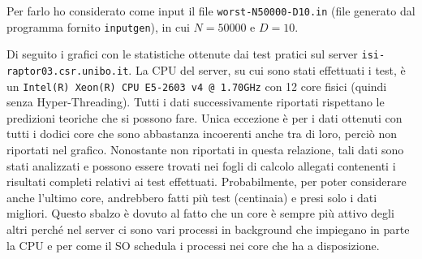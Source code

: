 \documentclass[11pt, a4paper]{article}
\begin{document}
Per farlo ho considerato come input il file \texttt{worst-N50000-D10.in} (file generato dal programma fornito \texttt{inputgen}),
in cui \(N = 50000\) e \(D = 10\).

Di seguito i grafici con le statistiche ottenute dai test pratici sul server
\texttt{isi-raptor03.\allowbreak csr.\allowbreak unibo.\allowbreak it}.
La CPU del server, su cui sono stati effettuati i test, è un \texttt{Intel(R) Xeon(R) CPU E5-2603 v4 @ 1.70GHz} con 12 core
fisici (quindi senza Hyper-Threading).
Tutti i dati successivamente riportati rispettano le predizioni teoriche che si possono fare.
Unica eccezione è per i dati ottenuti con tutti i dodici core che sono abbastanza incoerenti anche tra di loro, perciò non
riportati nel grafico.
Nonostante non riportati in questa relazione, tali dati sono stati analizzati e possono essere trovati nei fogli di calcolo
allegati contenenti i risultati completi relativi ai test effettuati.
Probabilmente, per poter considerare anche l'ultimo core, andrebbero fatti più test (centinaia) e presi solo i dati migliori.
Questo sbalzo è dovuto al fatto che un core è sempre più attivo degli altri perché nel server ci sono vari processi
in background che impiegano in parte la CPU e per come il SO schedula i processi nei core che ha a disposizione.
\end{document}
